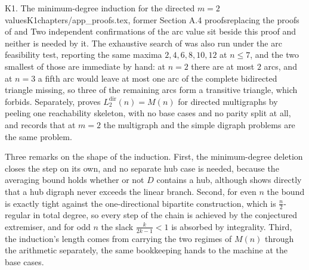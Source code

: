 \begin{offcut}{K1. The minimum-degree induction for the directed $m=2$ values}{K1}{chapters/app\_proofs.tex, former Section A.4 proofs}{replacing the proofs of  and }
Two independent confirmations of the arc value sit beside this proof and neither is needed by it. The exhaustive search of  was also run under the arc feasibility test, reporting the same maxima $2, 4, 6, 8, 10, 12$ at $n \le 7$, and the two smallest of those are immediate by hand: at $n = 2$ there are at most $2$ arcs, and at $n = 3$ a fifth arc would leave at most one arc of the complete bidirected triangle missing, so three of the remaining arcs form a transitive triangle, which  forbids. Separately,  proves $L_2^{\mathrm{dir}}(n) = M(n)$ for directed multigraphs by peeling one reachability skeleton, with no base cases and no parity split at all, and  records that at $m = 2$ the multigraph and the simple digraph problems are the same problem.

Three remarks on the shape of the induction. First, the minimum-degree deletion closes the step on its own, and no separate hub case is needed, because the averaging bound holds whether or not $D$ contains a hub, although  shows directly that a hub digraph never exceeds the linear branch. Second, for even $n$ the bound is exactly tight against the one-directional bipartite construction, which is $\frac{n}{2}$-regular in total degree, so every step of the chain is achieved by the conjectured extremiser, and for odd $n$ the slack $\frac{k}{2k-1} < 1$ is absorbed by integrality. Third, the induction's length comes from carrying the two regimes of $M(n)$ through the arithmetic separately, the same bookkeeping  hands to the machine at the base cases.
\end{offcut}

